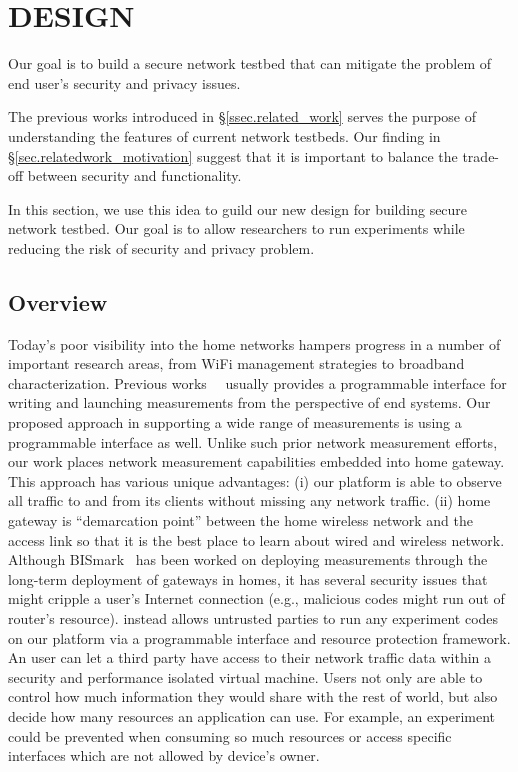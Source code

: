 \chapter{\sysname DESIGN}
\label{sec.design}
Our goal is to build a secure network testbed that can mitigate the problem 
of end user's security and privacy issues. 

The previous works introduced in \S{\ref{ssec.related_work}} serves the purpose of understanding the features of current network testbeds. Our finding in \S{\ref{sec.relatedwork_motivation}} suggest that it is important to balance the trade-off between security and functionality.

In this section, we use this idea to guild our new design for building secure network testbed. Our goal is to allow researchers to run experiments while reducing the risk of security and privacy problem.

\section{Overview}
Today's poor visibility into the home networks hampers progress in a number of important research areas, from WiFi management strategies to broadband characterization. Previous works~\cite{sanchez2014measurement}~\cite{dhawan2012fathom} usually provides a programmable interface for writing and launching measurements from the perspective of end systems. Our proposed approach in supporting a wide range of measurements is using a programmable interface as well. Unlike such prior network measurement efforts, our work places network measurement capabilities embedded into home gateway. This approach has various unique advantages: (i) our platform is able to observe all traffic to and from its clients without missing any network traffic. (ii) home gateway is ``demarcation point'' between the home wireless network and the access link so that it is the best place to learn about wired and wireless network. Although BISmark~\cite{183951} has been worked on deploying measurements through the long-term deployment of gateways in homes, it has several security issues that might cripple a user's Internet connection (e.g., malicious codes might run out of router's resource). \sysname instead allows untrusted parties to run any experiment codes on our platform via a programmable interface and resource protection framework. An user can let a third party have access to their network traffic data within a security and performance isolated virtual machine. Users not only are able to control how much information they would share with the rest of world, but also decide how many resources an application can use. For example, an experiment could be prevented when consuming so much resources or access specific interfaces which are not allowed by device's owner. 

